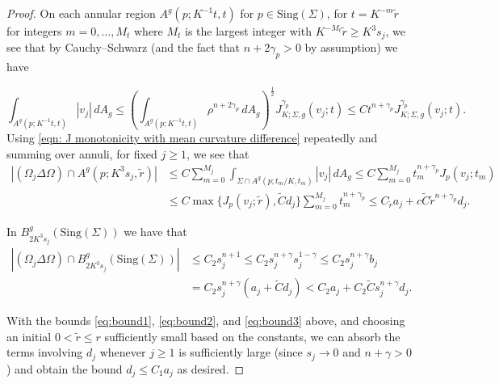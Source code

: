 \documentclass[12pt]{article}
\begin{document}
\begin{proof}
On each annular region $A^g(p;K^{-1}t,t)$ for $p \in \mathrm{Sing}(\Sigma)$, for $t = K^{-m}\tilde{r}$ for integers $m = 0, \dots, M_t$ where $M_t$ is the largest integer with $K^{-M_t}\tilde{r} \geq K^3s_j$, we see that by Cauchy--Schwarz (and the fact that $n + 2\gamma_p  >0$ by assumption) we have

$$\int_{A^g(p;K^{-1}t,t)} |v_j| \, dA_g \leq \left(\int_{A^g(p;K^{-1}t,t)} \rho^{n + 2\gamma_p} \, dA_g\right)^{\frac{1}{2}} J^{\gamma_p}_{K;\Sigma,g}(v_j;t) \leq Ct^{n + \gamma_p}J^{\gamma_p}_{K;\Sigma,g}(v_j;t).$$
Using \eqref{eqn: J monotonicity with mean curvature difference} repeatedly and summing over annuli, for fixed $j \geq 1$, we see that 
\begin{equation}\label{eq:bound2}
\begin{split}
    |(\Omega_j \Delta \Omega) \cap A^g(p;K^3s_j,\tilde{r})| &\leq 
    C\sum_{m=0}^{M_j}
\int_{\Sigma\cap A^g(p;t_m/K,t_m)}
|v_j|\,dA_g  \leq C\sum_{m=0}^{M_j}
t_m^{n+\gamma_p}J_p(v_j;t_m) \\
& \leq C \max\{ J_p(v_j;\tilde r), \tilde C d_j\} \sum_{m=0}^{M_j}
t_m^{n+\gamma_p}
\leq C_{\tilde{r}}a_j + c\widetilde{C}\tilde{r}^{n + \gamma_p} d_j.
\end{split}
\end{equation}


In $B_{2K^3s_j}^g(\mathrm{Sing}(\Sigma))$ we have that
\begin{equation}
\begin{split}\label{eq:bound3}
    |(\Omega_j \Delta \Omega) \cap  B_{2K^3s_j}^g(\mathrm{Sing}(\Sigma))| &\leq C_2s_j^{n + 1} \leq C_2s_j^{n + \gamma}s_j^{1 - \gamma} \leq C_2 s_j^{n + \gamma}b_j \\
    &= C_2 s_j^{n + \gamma}(a_j + \widetilde{C}d_j) < C_2a_j + C_2\widetilde{C}s_j^{n + \gamma}d_j. 
\end{split}
\end{equation}

With the bounds \eqref{eq:bound1}, \eqref{eq:bound2}, and \eqref{eq:bound3} above, and choosing an initial $0 < \tilde{r} \leq r$ sufficiently small based on the constants, we can absorb the terms involving $d_j$ whenever $j \geq 1$ is sufficiently large (since $s_j \rightarrow 0$ and $n + \gamma > 0$) and obtain the bound $d_j \leq C_1 a_j$ as desired.

\bigskip


\end{proof}
\end{document}
